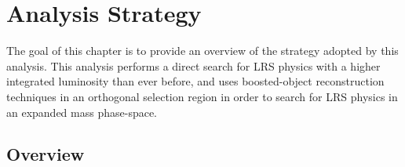 \chapter{Analysis Strategy}
\label{ch:strategy}
The goal of this chapter is to provide an overview of the strategy adopted by this analysis. %
This analysis performs a direct search for LRS physics with a higher integrated luminosity than ever before, and uses boosted-object reconstruction techniques in an orthogonal selection region in order to search for LRS physics in an expanded \WRNR mass phase-space.

\section{Overview}

